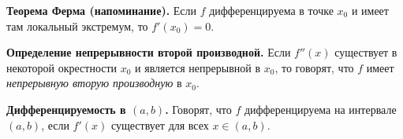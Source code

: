 
\textbf{Теорема Ферма (напоминание).}
Если $f$ дифференцируема в точке $x_0$ и имеет там локальный экстремум, то $f'(x_0)=0$.

\medskip

\textbf{Определение непрерывности второй производной.}
Если $f''(x)$ существует в некоторой окрестности $x_0$ и является непрерывной в $x_0$, то говорят, что $f$ имеет \emph{непрерывную вторую производную} в $x_0$.

\medskip

\textbf{Дифференцируемость в $(a,b)$.}
Говорят, что $f$ дифференцируема на интервале $(a,b)$, если $f'(x)$ существует для всех $x\in(a,b)$.
